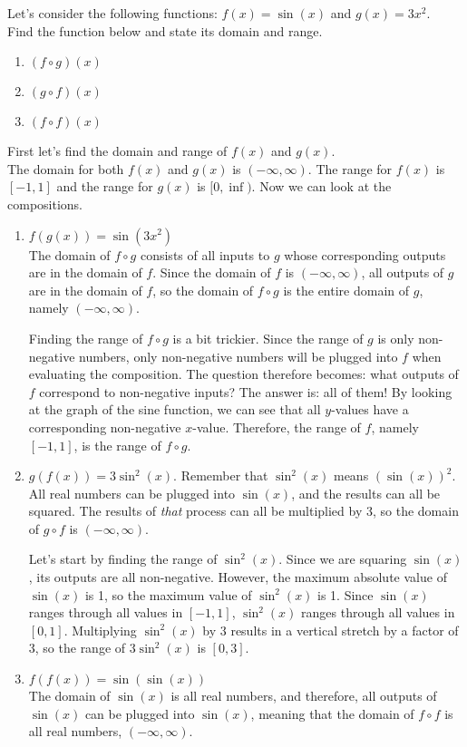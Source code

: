 \documentclass{ximera}
\begin{document}
\begin{example}
Let's consider the following functions: $f(x)=\sin{(x)}$ and $g(x)=3x^2$.
\\
Find the function below and state its domain and range.
\begin{enumerate}
\item $(f \circ g)(x)$
\item $(g \circ f)(x)$
\item $(f \circ f)(x)$
\end{enumerate}

\begin{explanation}
First let's find the domain and range of $f(x)$ and $g(x)$.\\
The domain for both $f(x)$ and $g(x)$ is $(-\infty , \infty)$. The range for $f(x)$ is $[-1,1]$ and the range for $g(x)$ is $[0,\inf)$. Now we can look at the compositions.
\begin{enumerate}
\item $f(g(x))= \sin(3x^2)$\\
The domain of $f \circ g$ consists of all inputs to $g$ whose corresponding outputs are in the domain of $f$.  Since the domain of $f$ is $(-\infty, \infty)$, all outputs of $g$ are in the domain of $f$, so the domain of $f \circ g$ is the entire domain of $g$, namely $(-\infty , \infty)$.

Finding the range of $f \circ g$ is a bit trickier. Since the range of $g$ is only non-negative numbers, only non-negative numbers will be plugged into $f$ when evaluating the composition. The question therefore becomes: what outputs of $f$ correspond to non-negative inputs? The answer is: all of them! By looking at the graph of the sine function, we can see that all $y$-values have a corresponding non-negative $x$-value. Therefore, the range of $f$, namely $[-1, 1]$, is the range of $f \circ g$.

\item $g(f(x)) =3\sin^2(x)$. Remember that $\sin^2(x)$ means $(\sin(x))^2$.\\
All real numbers can be plugged into $\sin(x)$, and the results can all be squared. The results of \textit{that} process can all be multiplied by 3, so the domain of $g \circ f$ is $(-\infty, \infty)$.

Let's start by finding the range of $\sin^2(x)$. Since we are squaring $\sin(x)$, its outputs are all non-negative. However, the maximum absolute value of $\sin(x)$ is 1, so the maximum value of $\sin^2(x)$ is 1. Since $\sin(x)$ ranges through all values in $[-1, 1]$, $\sin^2(x)$ ranges through all values in $[0, 1]$. Multiplying $\sin^2(x)$ by 3 results in a vertical stretch by a factor of 3, so the range of $3\sin^2(x)$ is $[0, 3]$. 
\item $f(f(x))= \sin(\sin(x))$\\
The domain of $\sin(x)$ is all real numbers, and therefore, all outputs of $\sin(x)$ can be plugged into $\sin(x)$, meaning that the domain of $f \circ f$ is all real numbers, $(-\infty, \infty)$. 


\end{enumerate}
\end{explanation}
\end{example}
\end{document}
